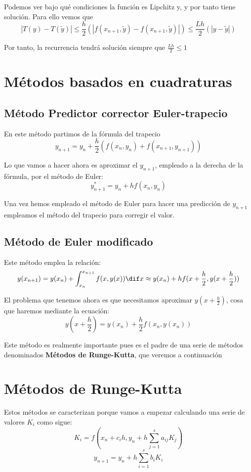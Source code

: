 \documentclass{apuntes}
\begin{document}
Podemos ver bajo qué condiciones la función es Lipchitz y, y por tanto tiene solución. Para ello vemos que
\[|T(y) - T(\tilde{y})| \leq \frac{h}{2} \left( |f(x_{n+1}, \tilde{y}) - f(x_{n+1},\tilde{y})|\right) \leq \frac{Lh}{2}\left( |y-\tilde{y}|\right)\]

Por tanto, la recurrencia tendrá solución siempre que $\frac{Lh}{2} \leq 1$

\section{Métodos basados en cuadraturas}
\subsection{Método Predictor corrector Euler-trapecio}
En este método partimos de la fórmula del trapecio
\[y_{n+1} = y_n + \frac{h}{2} \left(f(x_n,y_n)+f(x_{n+1}, y_{n+1}) \right)\]

Lo que vamos a hacer ahora es aproximar el $y_{n+1}$, empleado a la derecha de la fórmula, por el método de Euler:
\[y^*_{n+1} = y_n + h f(x_n,y_n)\]

Una vez hemos empleado el método de Euler para hacer una predicción de $y_{n+1}$ empleamos el método del trapecio para corregir el valor.

\subsection{Método de Euler modificado}
Este método emplea la relación:
\[y(x_{n+1}) = y(x_n) + \int_{x_n}^{x_{n+1}} f(x,y(x))\dif x \approx y(x_n) + h f(x+\frac{h}{2},y(x+\frac{h}{2}))\]

El problema que tenemos ahora es que necesitamos aproximar $y(x+\frac{h}{2})$, cosa que haremos mediante la ecuación:
\[y(x+\frac{h}{2}) = y(x_n)+\frac{h}{2}f(x_n, y(x_n))\]

Este método es realmente importante pues es el padre de una serie de métodos denominados \textbf{Métodos de Runge-Kutta}, que veremos a continuación

\section{Métodos de Runge-Kutta}
Estos métodos se caracterizan porque vamos a empezar calculando una serie de valores $K_i$ como sigue:
\[K_i = f\left(x_n+c_ih, y_n+h \sum_{j=1}^sa_{ij}K_j\right)\]
\[y_{n+1} = y_n+ h \sum_{i=1}^s b_i K_i\]
\end{document}
